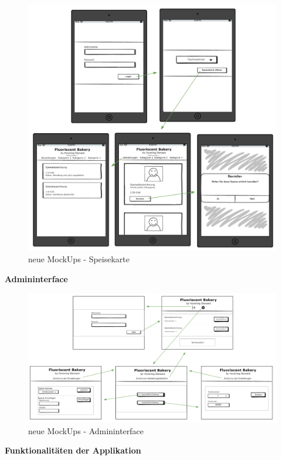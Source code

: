 			\begin{figure}[H]
			\begin{centering}
			\includegraphics[width = 1\textwidth]{Bilder/Jok_neue_mockups}
			\par\end{centering}
			\caption{neue MockUps - Speisekarte}
			\label{neue MockUps - Speisekarte}
			\end{figure}\textbf{Admininterface}\\
			\begin{figure}[H]
			\begin{centering}
			\includegraphics[width = 1\textwidth]{Bilder/Jok_neue_mockups_admin}
			\par\end{centering}
			\caption{neue MockUps - Admininterface}
			\label{neue MockUps - Admininterface}
			\end{figure}\textbf{Funktionalitäten der Applikation}\\
